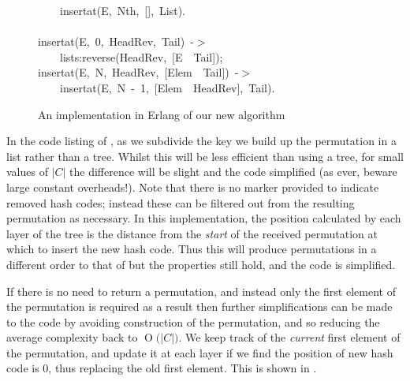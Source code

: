 \documentclass[runningheads,a4paper]{llncs}
\newcommand{\hlstd}[1]{\textcolor[rgb]{0,0,0}{#1}}
\newcommand{\hlnum}[1]{\textcolor[rgb]{0.69,0.49,0}{#1}}
\newcommand{\hlopt}[1]{\textcolor[rgb]{0,0,0}{#1}}
\newcommand{\hlkwd}[1]{\textcolor[rgb]{0,0,0.51}{#1}}
\newcommand{\BigO}[1]{\ensuremath{\operatorname{O}\bigl(#1\bigr)}}
\begin{document}
\begin{figure}
\hlstd{}\hlstd{\ \ \ \ }\hlstd{}\hlkwd{insert\textunderscore at}\hlstd{}\hlopt{(}\hlstd{E}\hlopt{,\ }\hlstd{Nth}\hlopt{,\ {[}{]},\ }\hlstd{List}\hlopt{).}\hspace*{\fill}\\
\hlstd{}\hspace*{\fill}\\
\hlkwd{insert\textunderscore at}\hlstd{}\hlopt{(}\hlstd{E}\hlopt{,\ }\hlstd{}\hlnum{0}\hlstd{}\hlopt{,\ }\hlstd{HeadRev}\hlopt{,\ }\hlstd{Tail}\hlopt{)\ {-}$>$}\hspace*{\fill}\\
\hlstd{}\hlstd{\ \ \ \ }\hlstd{}\hlkwd{lists}\hlstd{}\hlopt{:}\hlstd{}\hlkwd{reverse}\hlstd{}\hlopt{(}\hlstd{HeadRev}\hlopt{,\ {[}}\hlstd{E\ \textbar \ Tail}\hlopt{{]});}\hspace*{\fill}\\
\hlstd{}\hlkwd{insert\textunderscore at}\hlstd{}\hlopt{(}\hlstd{E}\hlopt{,\ }\hlstd{N}\hlopt{,\ }\hlstd{HeadRev}\hlopt{,\ {[}}\hlstd{Elem\ \textbar \ Tail}\hlopt{{]})\ {-}$>$}\hspace*{\fill}\\
\hlstd{}\hlstd{\ \ \ \ }\hlstd{}\hlkwd{insert\textunderscore at}\hlstd{}\hlopt{(}\hlstd{E}\hlopt{,\ }\hlstd{N\ }\hlopt{{-}\ }\hlstd{}\hlnum{1}\hlstd{}\hlopt{,\ {[}}\hlstd{Elem\ \textbar \ HeadRev}\hlopt{{]},\ }\hlstd{Tail}\hlopt{).}\hspace*{\fill}\\
\mbox{}
\normalfont
\normalsize
\caption{An implementation in Erlang of our new algorithm}
\label{fig:code:new}
\end{figure}

In the code listing of , as we subdivide the key we
build up the permutation in a list rather than a tree. Whilst this
will be less efficient than using a tree, for small values of $|C|$
the difference will be slight and the code simplified (as ever, beware
large constant overheads!). Note that there is no marker provided to
indicate removed hash codes; instead these can be filtered out from
the resulting permutation as necessary. In this implementation, the
position calculated by each layer of the tree is the distance from the
{\em start} of the received permutation at which to insert the new
hash code. Thus this will produce permutations in a different order to
that of  but the properties still hold, and the
code is simplified.

If there is no need to return a permutation, and instead only the
first element of the permutation is required as a result then further
simplifications can be made to the code by avoiding construction of
the permutation, and so reducing the average complexity back to
$\BigO{|C|}$. We keep track of the {\em current} first element of the
permutation, and update it at each layer if we find the position of
new hash code is 0, thus replacing the old first element. This is
shown in .
\end{document}
